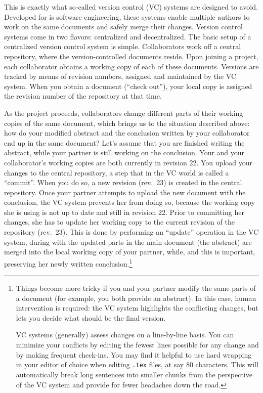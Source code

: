 \documentclass[]{article}
\begin{document}
This is exactly what so-called version control (VC) systems are designed to avoid. 
Developed for is software engineering, these systems enable multiple authors to 
work on the same documents and safely merge their changes.
Version control systems come in two flavors: centralized and decentralized.
The basic setup of a 
centralized version control system is simple. Collaborators work off a central repository, where 
the version-controlled documents reside. Upon joining a project, each collaborator 
obtains a working copy of each of these documents. Versions are tracked by means of 
revision numbers, assigned and maintained by the VC system. When you obtain a document 
(``check out''), your local copy is assigned the revision number of the repository at 
that time. 

As the project proceeds, collaborators change different parts of their working copies 
of the same document, which brings us to the situation described above: how do your 
modified abstract and the conclusion written by your collaborator end up in the same 
document? Let's assume that you are finished writing the abstract, while your partner 
is still working on the conclusion. Your and your collaborator's working copies are 
both currently in revision 22. You upload your changes to the central repository, a 
step that in the VC world is called a ``commit''. When you do so, a new revision 
(rev.~23) is created in the central repository. Once your partner attempts to upload 
the new document with the conclusion, the VC system prevents her from doing so, because 
the working copy she is using is not up to date and still in revision 22. Prior to 
committing her changes, she has to update her working copy to the current revision of 
the repository (rev.~23). This is done by performing an ``update'' operation in the VC 
system, during with the updated parts in the main document (the abstract) are merged 
into the local working copy of your partner, while, and this is important, preserving 
her newly written conclusion.\footnote{Things become more tricky if you and your 
partner modify the same parts of a document (for example, you both provide an 
abstract). In this case, human intervention is required: the VC system highlights the 
conflicting changes, but lets you decide what should be the final version.

VC systems (generally) assess changes on a line-by-line basis. You can
minimize your conflicts by editing the fewest lines possible for any change
and by making frequent check-ins. You may find it helpful to use hard wrapping
in your editor of choice when editing \texttt{.tex} files, at say 80
characters. This will automatically break long sentences into smaller chunks
from the perspective of the VC system and provide for fewer headaches down the
road.}
\end{document}
